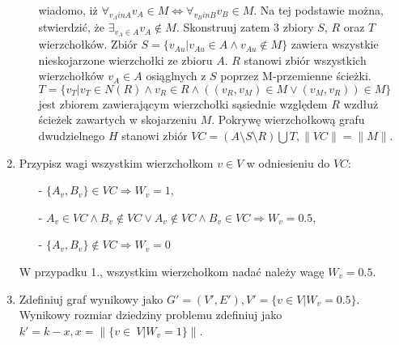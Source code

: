 \begin{enumerate}
\begin{itemize}
        wiadomo, iż ${\forall_{v_A in A}{v_A \in M} \iff \forall_{v_B in B}{v_B \in M}}$.
        Na tej podstawie można, stwierdzić, że $\exists_{v_A \in A}{v_A \notin
        M}$.
        Skonstruuj zatem 3 zbiory $S$, $R$ oraz $T$ wierzchołków. Zbiór
        $S = \{v_{Au}|v_{Au} \in A \land v_{Au} \notin M\}$ zawiera wszystkie
        nieskojarzone wierzchołki ze zbioru $A$.
        $R$ stanowi zbiór wszystkich wierzchołków $v_A \in A$ osiąglnych z $S$
        poprzez M-przemienne ścieżki. \\
        $T=\{v_T|v_T \in N(R) \land v_R \in R \land ((v_R,v_M) \in M \lor (v_M,v_R)) \in M\}$ 
        jest zbiorem zawierającym wierzchołki sąsiednie względem $R$ wzdłuż 
        ścieżek zawartych w skojarzeniu $M$.
        Pokrywę wierzchołkową grafu dwudzielnego $H$ stanowi zbiór 
        ${VC=(A \setminus S \setminus R) \bigcup T}, \|VC\|=\|M\|$.
    \end{itemize}
  \item Przypisz wagi wszystkim wierzchołkom $v \in V$ w odniesieniu do $VC$:
    \begin{itemize}
      \item[-] $\{A_v, B_v\} \in VC \Rightarrow W_v=1$,
      \item[-] $A_v \in VC \land B_v \notin VC \lor A_v \notin VC \land B_v \in
        VC \Rightarrow W_v=0.5$,
      \item[-] $\{A_v, B_v\} \notin VC \Rightarrow W_v=0$
    \end{itemize}
    W przypadku 1., wszystkim wierzchołkom nadać należy wagę $W_v=0.5$.
  \item Zdefiniuj graf wynikowy jako 
    $G\prime=(V\prime, E\prime), V\prime=\{v \in V|W_v=0.5\}$.
    Wynikowy rozmiar dziedziny problemu zdefiniuj jako 
    ${k\prime=k-x, x=\|\{v\in~V|W_v=1\}}\|$.
\end{enumerate}


